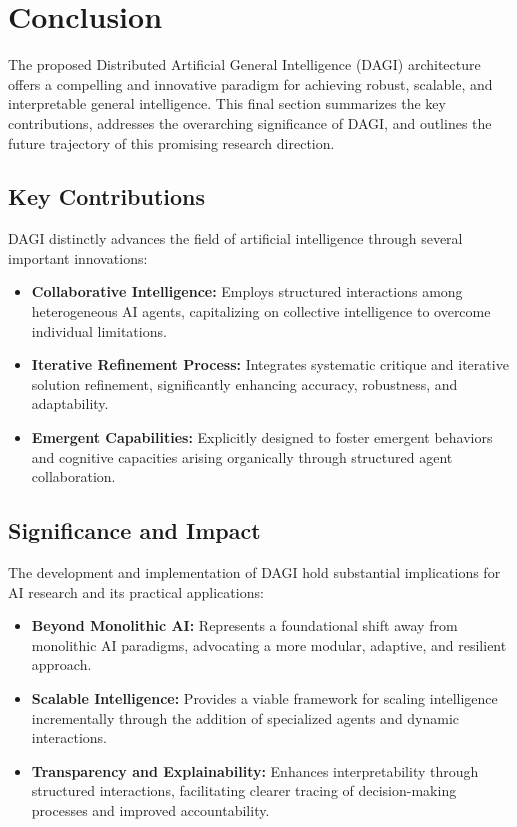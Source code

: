 \documentclass[12pt]{amsart}
\begin{document}
\section{Conclusion}

The proposed Distributed Artificial General Intelligence (DAGI) architecture offers a compelling and innovative paradigm for achieving robust, scalable, and interpretable general intelligence. This final section summarizes the key contributions, addresses the overarching significance of DAGI, and outlines the future trajectory of this promising research direction.

\subsection{Key Contributions}

DAGI distinctly advances the field of artificial intelligence through several important innovations:

\begin{itemize}
    \item \textbf{Collaborative Intelligence:} Employs structured interactions among heterogeneous AI agents, capitalizing on collective intelligence to overcome individual limitations.
    \item \textbf{Iterative Refinement Process:} Integrates systematic critique and iterative solution refinement, significantly enhancing accuracy, robustness, and adaptability.
    \item \textbf{Emergent Capabilities:} Explicitly designed to foster emergent behaviors and cognitive capacities arising organically through structured agent collaboration.
\end{itemize}

\subsection{Significance and Impact}

The development and implementation of DAGI hold substantial implications for AI research and its practical applications:

\begin{itemize}
    \item \textbf{Beyond Monolithic AI:} Represents a foundational shift away from monolithic AI paradigms, advocating a more modular, adaptive, and resilient approach.
    \item \textbf{Scalable Intelligence:} Provides a viable framework for scaling intelligence incrementally through the addition of specialized agents and dynamic interactions.
    \item \textbf{Transparency and Explainability:} Enhances interpretability through structured interactions, facilitating clearer tracing of decision-making processes and improved accountability.
\end{itemize}
\end{document}
